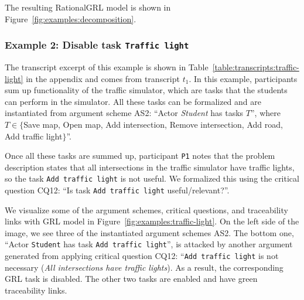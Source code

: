 The resulting RationalGRL model is shown in Figure~\ref{fig:examples:decomposition}. %


\subsubsection{Example 2: Disable task \texttt{Traffic light}}

The transcript excerpt of this example is shown in Table~\ref{table:transcripts:traffic-light} in the appendix and comes from transcript $t_1$. In this example, participants sum up functionality of the traffic simulator, which are tasks that the students can perform in the simulator. All these tasks can be formalized and are instantiated from  argument scheme AS2: ``Actor \emph{Student} has tasks $T$'', where $T\in\{$Save map, Open map, Add intersection, Remove intersection, Add road, Add traffic light$\}$''. 

Once all these tasks are summed up, participant \texttt{P1} notes that the problem description states that all intersections in the traffic simulator have traffic lights, so the task \texttt{Add traffic light} is not useful. We formalized this using the critical question CQ12: ``Is task \texttt{Add traffic light} useful/relevant?''. %

We visualize some of the argument schemes, critical questions, and traceability links with GRL model in Figure~\ref{fig:examples:traffic-light}. On the left side of the image, we see three of the instantiated argument schemes AS2. The bottom one, ``Actor \texttt{Student} has task \texttt{Add traffic light}'', is attacked by another argument generated from applying critical question CQ12: ``\texttt{Add traffic light} is %
not necessary (\emph{All intersections have traffic lights}). As a result, the corresponding GRL task is disabled. The other two tasks are enabled and have green traceability links.

